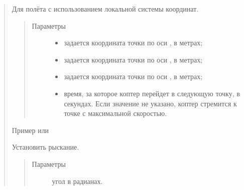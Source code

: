 \documentclass[a4paper,10pt,russian]{sphinxmanual}
\begin{document}
\begin{quote}
\begin{fulllineitems}
\label{\detokenize{programming/lua/lua:ap.goToLocalPoint}}
Для полёта с использованием локальной системы координат.
\begin{quote}\begin{description}
\item[{Параметры}] \leavevmode\begin{itemize}
\item {} 
 \textendash{} задается координата точки по оси , в метрах;

\item {} 
 \textendash{} задается координата точки по оси , в метрах;

\item {} 
 \textendash{} задается координата точки по оси , в метрах;

\item {} 
 \textendash{} время, за которое коптер перейдет в следующую точку, в секундах. Если значение не указано, коптер стремится к точке с максимальной скоростью.

\end{itemize}

\end{description}\end{quote}

Пример   или 

\end{fulllineitems}


\begin{fulllineitems}
\label{\detokenize{programming/lua/lua:ap.updateYaw}}
Установить рыскание.
\begin{quote}\begin{description}
\item[{Параметры}] \leavevmode
{} \textendash{} угол в радианах.


\end{description}
\end{quote}
\end{fulllineitems}
\end{quote}
\end{document}
